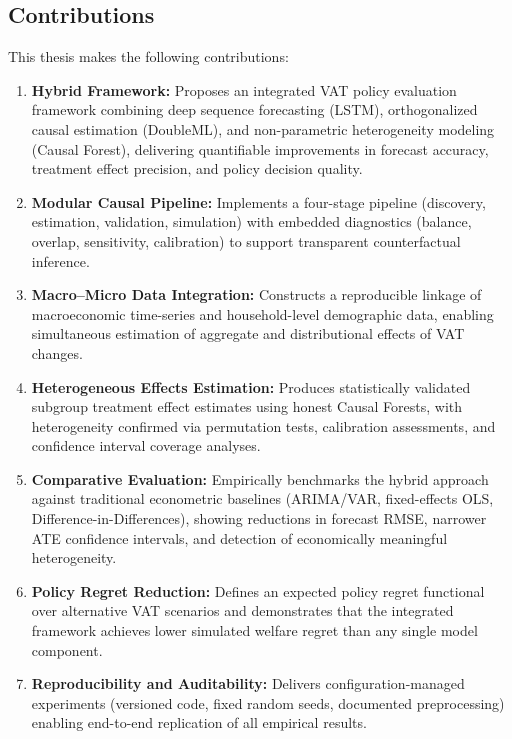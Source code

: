 \subsection{Contributions}\label{subsec:contributions}

This thesis makes the following contributions:

\begin{enumerate}
  \item \textbf{Hybrid Framework:} Proposes an integrated VAT policy evaluation framework combining deep sequence forecasting (LSTM), orthogonalized causal estimation (DoubleML), and non-parametric heterogeneity modeling (Causal Forest), delivering quantifiable improvements in forecast accuracy, treatment effect precision, and policy decision quality.
  \item \textbf{Modular Causal Pipeline:} Implements a four-stage pipeline (discovery, estimation, validation, simulation) with embedded diagnostics (balance, overlap, sensitivity, calibration) to support transparent counterfactual inference.
  \item \textbf{Macro--Micro Data Integration:} Constructs a reproducible linkage of macroeconomic time-series and household-level demographic data, enabling simultaneous estimation of aggregate and distributional effects of VAT changes.
  \item \textbf{Heterogeneous Effects Estimation:} Produces statistically validated subgroup treatment effect estimates using honest Causal Forests, with heterogeneity confirmed via permutation tests, calibration assessments, and confidence interval coverage analyses.
  \item \textbf{Comparative Evaluation:} Empirically benchmarks the hybrid approach against traditional econometric baselines (ARIMA/VAR, fixed-effects OLS, Difference-in-Differences), showing reductions in forecast RMSE, narrower ATE confidence intervals, and detection of economically meaningful heterogeneity.
  \item \textbf{Policy Regret Reduction:} Defines an expected policy regret functional over alternative VAT scenarios and demonstrates that the integrated framework achieves lower simulated welfare regret than any single model component.
  \item \textbf{Reproducibility and Auditability:} Delivers configuration-managed experiments (versioned code, fixed random seeds, documented preprocessing) enabling end-to-end replication of all empirical results.

\end{enumerate}



